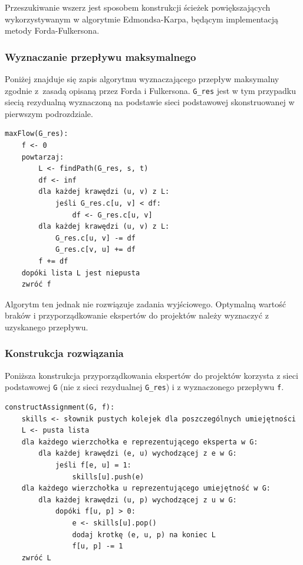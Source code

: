 \documentclass[12pt,a4paper]{article}
\theoremstyle{definition}
\begin{document}
\vspace{0.5em}
\noindent
Przeszukiwanie wszerz jest sposobem konstrukcji ścieżek powiększających wykorzystywanym w algorytmie Edmondsa-Karpa, będącym implementacją metody Forda-Fulkersona.

\subsubsection{Wyznaczanie przepływu maksymalnego}
Poniżej znajduje się zapis algorytmu wyznaczającego przepływ maksymalny zgodnie z~zasadą opisaną przez Forda i Fulkersona. \texttt{G\_res} jest w tym przypadku siecią rezydualną wyznaczoną na podstawie sieci podstawowej skonstruowanej w pierwszym podrozdziale.\\

\begin{tcolorbox}[title=Wyznaczanie przepływu maksymalnego]
\begin{verbatim}
maxFlow(G_res):
    f <- 0
    powtarzaj:
        L <- findPath(G_res, s, t)
        df <- inf
        dla każdej krawędzi (u, v) z L:
            jeśli G_res.c[u, v] < df:
                df <- G_res.c[u, v]
        dla każdej krawędzi (u, v) z L:
            G_res.c[u, v] -= df
            G_res.c[v, u] += df
        f += df
    dopóki lista L jest niepusta
    zwróć f
\end{verbatim}
\end{tcolorbox}

\vspace{0.5em}
\noindent
Algorytm ten jednak nie rozwiązuje zadania wyjściowego. Optymalną wartość braków i przyporządkowanie ekspertów do projektów należy wyznaczyć z uzyskanego przepływu.

\subsubsection{Konstrukcja rozwiązania}
Poniższa konstrukcja przyporządkowania ekspertów do projektów korzysta z sieci podstawowej \texttt{G} (nie z sieci rezydualnej \texttt{G\_res}) i z wyznaczonego przepływu \texttt{f}.\\

\begin{tcolorbox}[title=Wyznaczanie przydziału]
\begin{verbatim}
constructAssignment(G, f):
    skills <- słownik pustych kolejek dla poszczególnych umiejętności
    L <- pusta lista
    dla każdego wierzchołka e reprezentującego eksperta w G:
        dla każdej krawędzi (e, u) wychodzącej z e w G:
            jeśli f[e, u] = 1:
                skills[u].push(e)
    dla każdego wierzchołka u reprezentującego umiejętność w G:
        dla każdej krawędzi (u, p) wychodzącej z u w G:
            dopóki f[u, p] > 0:
                e <- skills[u].pop()
                dodaj krotkę (e, u, p) na koniec L
                f[u, p] -= 1
    zwróć L
\end{verbatim}
\end{tcolorbox}
\end{document}
